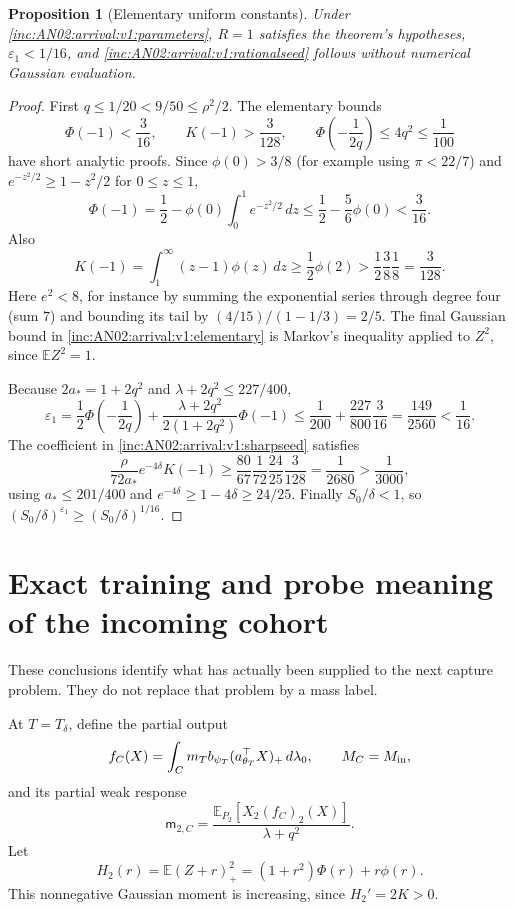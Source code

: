 \documentclass[11pt]{article}
\numberwithin{equation}{section}
\newtheorem{proposition}[theorem]{Proposition}
\theoremstyle{remark}
\newcommand{\E}{\mathbb E}
\newcommand{\dd}{\,d}
\begin{document}
\begin{proposition}[Elementary uniform constants]
\label{inc:AN02:arrival:v1:rational}
Under \eqref{inc:AN02:arrival:v1:parameters}, $R=1$ satisfies the theorem's
hypotheses, $\varepsilon_1<1/16$, and
\eqref{inc:AN02:arrival:v1:rationalseed} follows without numerical
Gaussian evaluation.
\end{proposition}
\begin{proof}
First $q\le1/20<9/50\le\rho^2/2$. The elementary bounds
\begin{equation}\label{inc:AN02:arrival:v1:elementary}
 \Phi(-1)<\frac3{16},\qquad K(-1)>\frac3{128},\qquad
 \Phi\!\left(-\frac1{2q}\right)\le4q^2\le\frac1{100}
\end{equation}
have short analytic proofs. Since $\phi(0)>3/8$ (for example using
$\pi<22/7$) and $e^{-z^2/2}\ge1-z^2/2$ for $0\le z\le1$,
\[
 \Phi(-1)=\frac12-\phi(0)\int_0^1e^{-z^2/2}\dd z
 \le\frac12-\frac56\phi(0)<\frac3{16}.
\]
Also
\[
 K(-1)=\int_1^\infty(z-1)\phi(z)\dd z
 \ge\frac12\phi(2)
 >\frac12\frac38\frac18=\frac3{128}.
\]
Here $e^2<8$, for instance by summing the exponential series through
degree four (sum $7$) and bounding its tail by
$(4/15)/(1-1/3)=2/5$. The final Gaussian bound in
\eqref{inc:AN02:arrival:v1:elementary} is Markov's inequality applied
to $Z^2$, since $\E Z^2=1$.

Because $2a_*=1+2q^2$ and $\lambda+2q^2\le227/400$,
\[
 \varepsilon_1
 =\frac12\Phi\!\left(-\frac1{2q}\right)
 +\frac{\lambda+2q^2}{2(1+2q^2)}\Phi(-1)
 \le\frac1{200}+\frac{227}{800}\frac3{16}
 =\frac{149}{2560}<\frac1{16}.
\]
The coefficient in \eqref{inc:AN02:arrival:v1:sharpseed} satisfies
\[
 \frac{\rho}{72a_*}e^{-4\delta}K(-1)
 \ge\frac{80}{67}\frac1{72}\frac{24}{25}\frac3{128}
 =\frac1{2680}>\frac1{3000},
\]
using $a_*\le201/400$ and $e^{-4\delta}\ge1-4\delta\ge24/25$.
Finally $S_0/\delta<1$, so
$(S_0/\delta)^{\varepsilon_1}\ge(S_0/\delta)^{1/16}$.
\end{proof}

\section{Exact training and probe meaning of the incoming cohort}
\label{inc:AN02:arrival:v1:meaning}
These conclusions identify what has actually been supplied to the next
capture problem. They do not replace that problem by a mass label.

At $T=T_\delta$, define the partial output
\[
 f_C(X)=\int_C m_T b_{\psi_T}(a_{\theta_T}^\top X)_+\dd\lambda_0,
 \qquad M_C=M_{\rm in},
\]
and its partial weak response
\[
 \mathsf m_{2,C}
 =\frac{\E_{P_2}[X_2(f_C)_2(X)]}{\lambda+q^2}.
\]
Let
\[
 H_2(r)=\E(Z+r)_+^2=(1+r^2)\Phi(r)+r\phi(r).
\]
This nonnegative Gaussian moment is increasing, since $H_2'=2K>0$.
\end{document}
